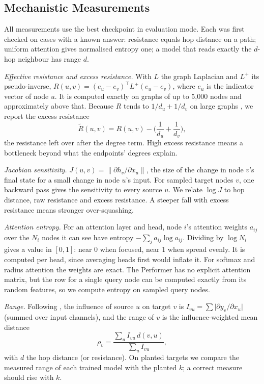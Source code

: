\subsection{Mechanistic Measurements}
\label{sec:measurements}
All measurements use the best checkpoint in evaluation mode. Each was first checked on cases with a known answer: resistance equals hop distance on a path; uniform attention gives normalised entropy one; a model that reads exactly the $d$-hop neighbour has range $d$.

\textit{Effective resistance and excess resistance.} With $L$ the graph Laplacian and $L^{+}$ its pseudo-inverse, $R(u,v)=(e_u-e_v)^\top L^{+}(e_u-e_v)$, where $e_u$ is the indicator vector of node $u$. It is computed exactly on graphs of up to 5,000 nodes and approximately above that. Because $R$ tends to $1/d_u+1/d_v$ on large graphs \citep{f_vonluxburg2014}, we report the excess resistance
\[
\tilde R(u,v) = R(u,v) - \Big(\frac{1}{d_u}+\frac{1}{d_v}\Big),
\]
the resistance left over after the degree term. High excess resistance means a bottleneck beyond what the endpoints' degrees explain.

\textit{Jacobian sensitivity.} $J(u,v)=\lVert\partial h_v/\partial x_u\rVert$, the size of the change in node $v$'s final state for a small change in node $u$'s input. For sampled target nodes $v$, one backward pass gives the sensitivity to every source $u$. We relate $\log J$ to hop distance, raw resistance and excess resistance. A steeper fall with excess resistance means stronger over-squashing.

\textit{Attention entropy.} For an attention layer and head, node $i$'s attention weights $a_{ij}$ over the $N_i$ nodes it can see have entropy $-\sum_j a_{ij}\log a_{ij}$. Dividing by $\log N_i$ gives a value in $[0,1]$: near 0 when focused, near 1 when spread evenly. It is computed per head, since averaging heads first would inflate it. For softmax and radius attention the weights are exact. The Performer has no explicit attention matrix, but the row for a single query node can be computed exactly from its random features, so we compute entropy on sampled query nodes.

\textit{Range.} Following \citet{bamberger2025}, the influence of source $u$ on target $v$ is $I_{vu}=\sum\lvert\partial y_v/\partial x_u\rvert$ (summed over input channels), and the range of $v$ is the influence-weighted mean distance
\[
\rho_v=\frac{\sum_u I_{vu}\,d(v,u)}{\sum_u I_{vu}},
\]
with $d$ the hop distance (or resistance). On planted targets we compare the measured range of each trained model with the planted $k$; a correct measure should rise with $k$.

